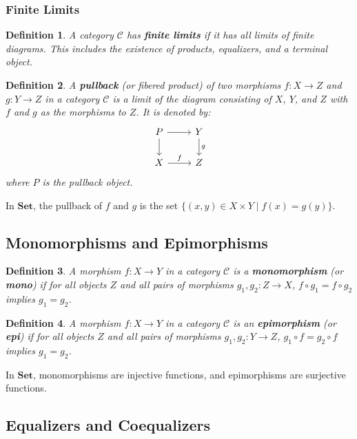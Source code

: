 \documentclass{article}
\newtheorem{definition}{Definition}[section]
\begin{document}
\subsubsection{Finite Limits}

\begin{definition}
    A category $\mathcal{C}$ has \textbf{finite limits} if it has all limits of finite diagrams. This includes the existence of products, equalizers, and a terminal object.
\end{definition}

\begin{definition}
    A \textbf{pullback} (or fibered product) of two morphisms $f \colon X \to Z$ and $g \colon Y \to Z$ in a category $\mathcal{C}$ is a limit of the diagram consisting of $X$, $Y$, and $Z$ with $f$ and $g$ as the morphisms to $Z$. It is denoted by:
    \[
        \begin{tikzcd}
            P \arrow[r] \arrow[d] & Y \arrow[d, "g"] \\
            X \arrow[r, "f"] & Z
        \end{tikzcd}
    \]
    where $P$ is the pullback object.
\end{definition}

In $\mathbf{Set}$, the pullback of $f$ and $g$ is the set $\{ (x,y) \in X \times Y \mid f(x) = g(y) \}$.

\subsection{Monomorphisms and Epimorphisms}

\begin{definition}
    A morphism $f \colon X \to Y$ in a category $\mathcal{C}$ is a \textbf{monomorphism} (or \textbf{mono}) if for all objects $Z$ and all pairs of morphisms $g_1, g_2 \colon Z \to X$, $f \circ g_1 = f \circ g_2$ implies $g_1 = g_2$.
\end{definition}

\begin{definition}
    A morphism $f \colon X \to Y$ in a category $\mathcal{C}$ is an \textbf{epimorphism} (or \textbf{epi}) if for all objects $Z$ and all pairs of morphisms $g_1, g_2 \colon Y \to Z$, $g_1 \circ f = g_2 \circ f$ implies $g_1 = g_2$.
\end{definition}

In $\mathbf{Set}$, monomorphisms are injective functions, and epimorphisms are surjective functions.

\subsection{Equalizers and Coequalizers}
\end{document}
